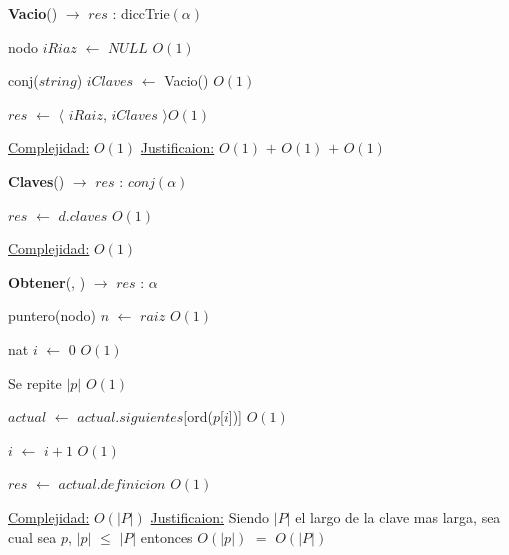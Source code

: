 \begin{Algoritmos}
  
  
\begin{algorithm}[H]
{\textbf{Vacio}() $\to$ $res$ : diccTrie$(\alpha)$}
\begin{algorithmic}[1]

\State nodo $iRiaz$ $\gets $ $NULL$  \Comment $O(1)$
 
\State conj($string$) $iClaves$ $\gets$ Vacio() \Comment $O(1)$

\State $res$ $\gets$  $\langle$ $iRaiz$, $iClaves$ $\rangle$\Comment $O(1)$

\medskip
\State \underline{Complejidad:} $O(1)$
\State \underline{Justificaion:} $O(1)$ $+$ $O(1)$ $+$ $O(1)$

\end{algorithmic}
\end{algorithm}  

\begin{algorithm}[H]
{\textbf{Claves}(}) $\to$ $res$ : $conj(\alpha)$
\begin{algorithmic}[1]

\State $res$ $\gets$ $d$.$claves$ \Comment $O(1)$

\medskip
\State \underline{Complejidad:} $O(1)$

\end{algorithmic}
\end{algorithm}
  
  
  
\begin{algorithm}[H]
{\textbf{Obtener}(, }) $\to$ $res$ : $\alpha$
\begin{algorithmic}[1]

\State puntero(nodo) $n$ $\gets$ $raiz$ \Comment $O(1)$

\State nat $i$ $\gets$ $0$ \Comment $O(1)$


   \Comment Se repite $|p|$ $O(1)$
		

	\State $actual$ $\gets$ $actual$.$siguientes$[ord($p$[$i$])] \Comment $O(1)$

	\State $i$ $\gets$ $i + 1$ \Comment $O(1)$
\EndWhile 


\State $res$ $\gets$ $actual$.$definicion$ \Comment $O(1)$ 

\medskip
\State \underline{Complejidad:} $O(|P|)$
\State \underline{Justificaion:} Siendo $|P|$ el largo de la clave mas larga, sea cual sea $p$, $|p|$ $\leq$ $|P|$ entonces 	$O(|p|)$ $=$ $O(|P|)$


\end{algorithmic}
\end{algorithm}
\end{Algoritmos}
